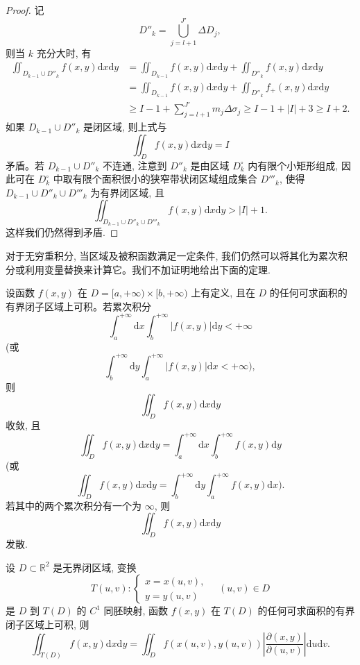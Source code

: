 \begin{proof}
记
\[
  D''_k=\bigcup_{j=l+1}^{J'}\Delta D_j,
\]
则当 $k$ 充分大时, 有
\[
\begin{aligned}
  \iint_{D_{k-1}\cup D''_k}f(x,y)\mathrm dx\mathrm dy
  &=\iint_{D_{k-1}}f(x,y)\mathrm dx\mathrm dy
  +\iint_{D''_k}f(x,y)\mathrm dx\mathrm dy\\
  &=\iint_{D_{k-1}}f(x,y)\mathrm dx\mathrm dy
  +\iint_{D''_k}f_+(x,y)\mathrm dx\mathrm dy\\
  &\geqslant I-1+\sum_{j=l+1}^{J'}m_j\Delta\sigma_j
  \geqslant I-1+|I|+3\geqslant I+2.
\end{aligned}
\]
如果 $D_{k-1}\cup D''_k$ 是闭区域, 则上式与
\[
  \iint_D f(x,y)\mathrm dx\mathrm dy=I
\]
矛盾。若 $D_{k-1}\cup D''_k$ 不连通, 注意到 $D''_k$ 是由区域 $D_k^\circ$ 内有限个小矩形组成, 因此可在 $D_k^\circ$ 中取有限个面积很小的狭窄带状闭区域组成集合 $D'''_k$, 使得 $D_{k-1}\cup D''_k\cup D'''_k$ 为有界闭区域, 且
\[
  \iint_{D_{k-1}\cup D''_k\cup D'''_k}f(x,y)\mathrm dx\mathrm dy>|I|+1.
\]
这样我们仍然得到矛盾.
\end{proof}


对于无穷重积分, 当区域及被积函数满足一定条件, 我们仍然可以将其化为累次积分或利用变量替换来计算它。我们不加证明地给出下面的定理.

\begin{theorem}\label{theorem:ma-15-5-4}
设函数 $f(x,y)$ 在 $D=[a,+\infty)\times[b,+\infty)$ 上有定义, 且在 $D$ 的任何可求面积的有界闭子区域上可积。若累次积分
\[
  \int_a^{+\infty}\mathrm dx\int_b^{+\infty}|f(x,y)|\mathrm dy<+\infty
\]
(或
\[
  \int_b^{+\infty}\mathrm dy\int_a^{+\infty}|f(x,y)|\mathrm dx<+\infty),
\]
则
\[
  \iint_D f(x,y)\mathrm dx\mathrm dy
\]
收敛, 且
\[
  \iint_D f(x,y)\mathrm dx\mathrm dy
  =\int_a^{+\infty}\mathrm dx\int_b^{+\infty}f(x,y)\mathrm dy
\]
(或
\[
  \iint_D f(x,y)\mathrm dx\mathrm dy
  =\int_b^{+\infty}\mathrm dy\int_a^{+\infty}f(x,y)\mathrm dx).
\]
若其中的两个累次积分有一个为 $\infty$, 则
\[
  \iint_D f(x,y)\mathrm dx\mathrm dy
\]
发散.
\end{theorem}


\begin{theorem}\label{theorem:ma-15-5-5}
设 $D\subset\mathbb R^2$ 是无界闭区域, 变换
\[
  T(u,v):
  \begin{cases}
    x=x(u,v),\\
    y=y(u,v)
  \end{cases}
  \quad (u,v)\in D
\]
是 $D$ 到 $T(D)$ 的 $C^1$ 同胚映射, 函数 $f(x,y)$ 在 $T(D)$ 的任何可求面积的有界闭子区域上可积, 则
\begin{equation}
  \iint_{T(D)}f(x,y)\mathrm dx\mathrm dy
  =\iint_D f(x(u,v),y(u,v))
  \left|\frac{\partial(x,y)}{\partial(u,v)}\right|\mathrm du\mathrm dv.
  \label{eq:ma-15-5-2}
\end{equation}
\end{theorem}


